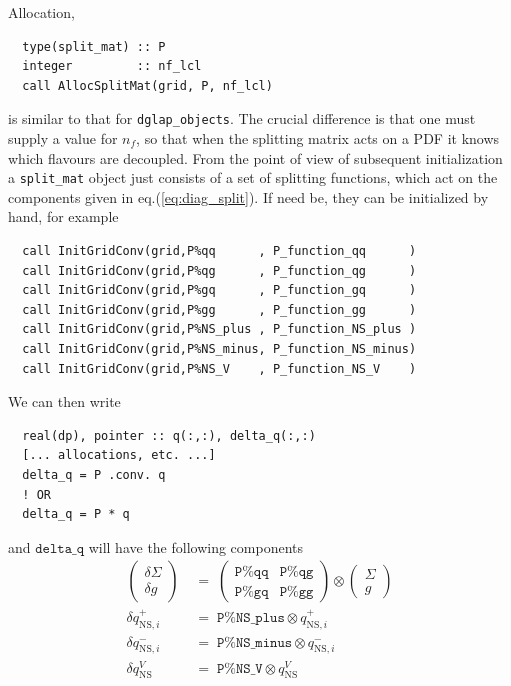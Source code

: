 \documentclass[12pt]{article}
\newcommand{\ttt}[1]{\texttt{#1}}
\begin{document}
Allocation,
\begin{verbatim}
  type(split_mat) :: P
  integer         :: nf_lcl
  call AllocSplitMat(grid, P, nf_lcl)
\end{verbatim}
is similar to that for \ttt{dglap\_objects}. The crucial difference is
that one must supply a value for $n_f$, so that when the splitting
matrix acts on a PDF it knows which flavours are decoupled. From the
point of view of subsequent initialization a \ttt{split\_mat} object
just consists of a set of splitting functions, which act on the
components given in eq.(\ref{eq:diag_split}). If need be, they can be
initialized by hand, for example
\begin{verbatim}
  call InitGridConv(grid,P%qq      , P_function_qq      )
  call InitGridConv(grid,P%qg      , P_function_qg      )
  call InitGridConv(grid,P%gq      , P_function_gq      )
  call InitGridConv(grid,P%gg      , P_function_gg      )
  call InitGridConv(grid,P%NS_plus , P_function_NS_plus )
  call InitGridConv(grid,P%NS_minus, P_function_NS_minus)
  call InitGridConv(grid,P%NS_V    , P_function_NS_V    )
\end{verbatim}
We can then write
\begin{verbatim}
  real(dp), pointer :: q(:,:), delta_q(:,:)
  [... allocations, etc. ...]
  delta_q = P .conv. q
  ! OR
  delta_q = P * q
\end{verbatim}
and $\ttt{delta\_q}$ will have the following components
\begin{align}
  \label{eq:Pmat_on_q}
  \left(\!\!
    \begin{array}{c}
      \delta\Sigma\\
       \delta g
    \end{array}
  \!\!\right)
    \;&= \;
  \left(
    \begin{array}{cc}
      \ttt{P\%qq} & \ttt{P\%qg}\\
      \ttt{P\%gq} & \ttt{P\%gg}
    \end{array}
  \right) 
  \otimes
  \left(\!\!
    \begin{array}{c}
      \Sigma\\
       g
    \end{array}
    \!\!\right) 
  \nonumber\\[3pt]
%
  \delta q^+_{\mathrm{NS},i} \;&=\; \ttt{P\%NS\_plus} \otimes
  q^+_{\mathrm{NS},i}\\[3pt] 
%
  \delta q^-_{\mathrm{NS},i} \;&=\; \ttt{P\%NS\_minus} \otimes
  q^-_{\mathrm{NS},i}\nonumber \\[3pt]
% 
  \delta q^V_{\mathrm{NS}} \;&=\; \ttt{P\%NS\_V} \otimes
  q^V_{\mathrm{NS}} \nonumber
\end{align}
\end{document}
